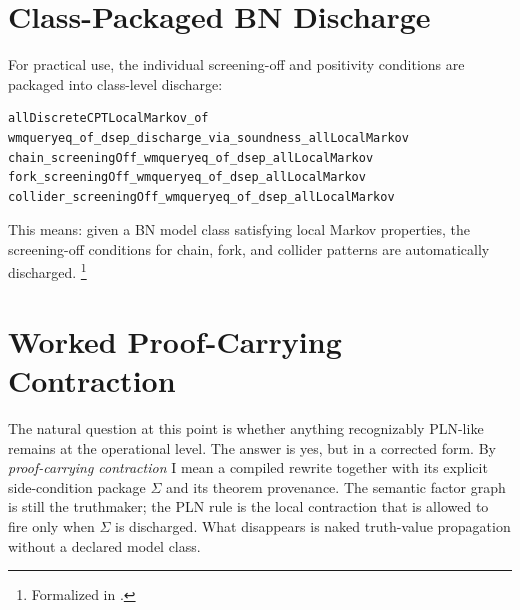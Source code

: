 \documentclass[11pt,openany]{report}
\begin{document}

\section{Class-Packaged BN Discharge}

For practical use, the individual screening-off and positivity conditions
are packaged into class-level discharge:
\begin{lstlisting}
allDiscreteCPTLocalMarkov_of
wmqueryeq_of_dsep_discharge_via_soundness_allLocalMarkov
chain_screeningOff_wmqueryeq_of_dsep_allLocalMarkov
fork_screeningOff_wmqueryeq_of_dsep_allLocalMarkov
collider_screeningOff_wmqueryeq_of_dsep_allLocalMarkov
\end{lstlisting}

This means: given a BN model class satisfying local Markov properties,
the screening-off conditions for chain, fork, and collider patterns are
automatically discharged.%
\footnote{Formalized in .}

\section{Worked Proof-Carrying Contraction}

The natural question at this point is whether anything recognizably
PLN-like remains at the operational level.  The answer is yes, but in a
corrected form.  By \emph{proof-carrying contraction} I mean a compiled
rewrite together with its explicit side-condition package $\Sigma$ and
its theorem provenance.  The semantic factor graph is still the
truthmaker; the PLN rule is the local contraction that is allowed to fire
only when $\Sigma$ is discharged.  What disappears is naked truth-value
propagation without a declared model class.
\end{document}
